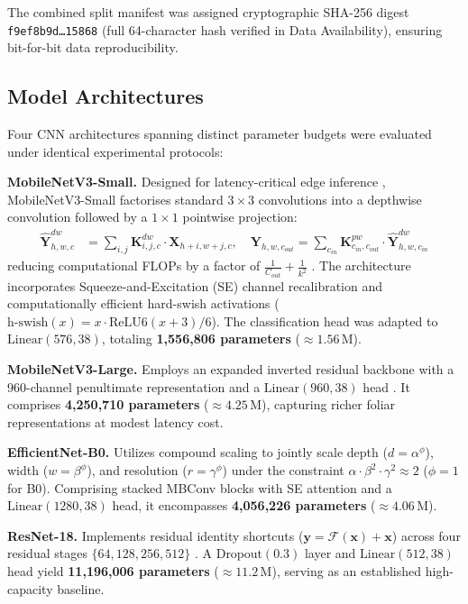 \documentclass[pdflatex,sn-mathphys-num]{sn-jnl}
\theoremstyle{thmstyleone}%
\theoremstyle{thmstyletwo}%
\theoremstyle{thmstylethree}%
\begin{document}
The combined split manifest was assigned cryptographic SHA-256 digest \texttt{f9ef8b9d\dots 15868} (full 64-character hash verified in Data Availability), ensuring bit-for-bit data reproducibility.

\subsection{Model Architectures}
\label{sec:models}

Four CNN architectures spanning distinct parameter budgets were evaluated under identical experimental protocols:

\textbf{MobileNetV3-Small.} Designed for latency-critical edge inference \citep{howard2019mobilenetv3}, MobileNetV3-Small factorises standard $3\times3$ convolutions into a depthwise convolution followed by a $1\times1$ pointwise projection:
\begin{align}
  \hat{\mathbf{Y}}^{dw}_{h,w,c} &= \sum_{i,j} \mathbf{K}^{dw}_{i,j,c} \cdot \mathbf{X}_{h+i, w+j, c}, \quad
  \mathbf{Y}_{h,w,c_{out}} = \sum_{c_{in}} \mathbf{K}^{pw}_{c_{in},c_{out}} \cdot \hat{\mathbf{Y}}^{dw}_{h,w,c_{in}}
  \label{eq:dw_conv}
\end{align}
reducing computational FLOPs by a factor of $\frac{1}{C_{out}} + \frac{1}{k^2}$ \citep{howard2017mobilenets}. The architecture incorporates Squeeze-and-Excitation (SE) channel recalibration \citep{hu2018squeeze} and computationally efficient hard-swish activations ($\text{h-swish}(x) = x \cdot \text{ReLU6}(x+3)/6$). The classification head was adapted to $\text{Linear}(576, 38)$, totaling \textbf{1{,}556{,}806 parameters} ($\approx 1.56$\,M).

\textbf{MobileNetV3-Large.} Employs an expanded inverted residual backbone with a 960-channel penultimate representation and a $\text{Linear}(960, 38)$ head \citep{howard2019mobilenetv3}. It comprises \textbf{4{,}250{,}710 parameters} ($\approx 4.25$\,M), capturing richer foliar representations at modest latency cost.

\textbf{EfficientNet-B0.} Utilizes compound scaling \citep{tan2019efficientnet} to jointly scale depth ($d = \alpha^\phi$), width ($w = \beta^\phi$), and resolution ($r = \gamma^\phi$) under the constraint $\alpha \cdot \beta^2 \cdot \gamma^2 \approx 2$ ($\phi=1$ for B0). Comprising stacked MBConv blocks with SE attention and a $\text{Linear}(1280, 38)$ head, it encompasses \textbf{4{,}056{,}226 parameters} ($\approx 4.06$\,M).

\textbf{ResNet-18.} Implements residual identity shortcuts ($\mathbf{y} = \mathcal{F}(\mathbf{x}) + \mathbf{x}$) across four residual stages $\{64, 128, 256, 512\}$ \citep{he2016resnet}. A $\text{Dropout}(0.3)$ layer and $\text{Linear}(512, 38)$ head yield \textbf{11{,}196{,}006 parameters} ($\approx 11.2$\,M), serving as an established high-capacity baseline.
\end{document}
